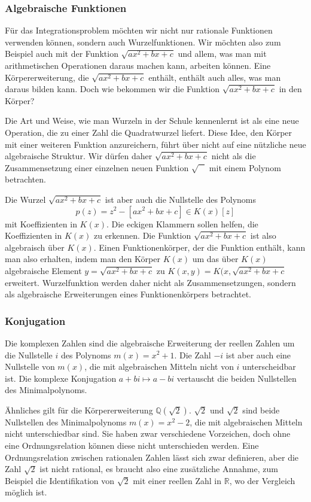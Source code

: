 %
%
\subsubsection{Algebraische Funktionen}
Für das Integrationsproblem möchten wir nicht nur rationale Funktionen
verwenden können, sondern auch Wurzelfunktionen.
Wir möchten also zum Beispiel auch mit der Funktion $\sqrt{ax^2+bx+c}$
und allem, was man mit arithmetischen Operationen daraus machen kann,
arbeiten können.
Eine Körpererweiterung, die $\sqrt{ax^2+bx+c}$ enthält, enthält auch
alles, was man daraus bilden kann.
Doch wie bekommen wir die Funktion $\sqrt{ax^2+bx+c}$ in den Körper?

Die Art und Weise, wie man Wurzeln in der Schule kennenlernt ist als
eine neue Operation, die zu einer Zahl die Quadratwurzel liefert.
Diese Idee, den Körper mit einer weiteren Funktion anzureichern,
führt über nicht auf eine nützliche neue algebraische Struktur.
Wir dürfen daher $\sqrt{ax^2+bx+c}$ nicht als die Zusammensetzung
einer einzelnen neuen Funktion $\sqrt{\phantom{A}}$ mit
einem Polynom betrachten.

Die Wurzel $\sqrt{ax^2+bx+c}$ ist aber auch die Nullstelle des Polynoms
\[
p(z)
=
z^2 - [ax^2+bx+c]
\in
K(x)[z]
\]
mit Koeffizienten in $K(x)$.
Die eckigen Klammern sollen helfen, die Koeffizienten in $K(x)$
zu erkennen.
Die Funktion $\sqrt{ax^2+bx+c}$ ist also algebraisch über $K(x)$.
Einen Funktionenkörper, der die Funktion enthält, kann man also erhalten,
indem man den Körper $K(x)$ um das über $K(x)$ algebraische Element
$y=\sqrt{ax^2+bx+c}$ zu $K(x,y)=K(x,\sqrt{ax^2+bx+c}$ erweitert.
Wurzelfunktion werden daher nicht als Zusammensetzungen, sondern als
algebraische Erweiterungen eines Funktionenkörpers betrachtet.

%
%
\subsubsection{Konjugation}
Die komplexen Zahlen sind die algebraische Erweiterung der reellen Zahlen
um die Nullstelle $i$ des Polynoms $m(x)=x^2+1$.
Die Zahl $-i$ ist aber auch eine Nullstelle von $m(x)$, die mit algebraischen
Mitteln nicht von $i$ unterscheidbar ist.
Die komplexe Konjugation $a+bi\mapsto a-bi$ vertauscht die beiden 
%
%
Nullstellen des Minimalpolynoms.

Ähnliches gilt für die Körpererweiterung $\mathbb{Q}(\!\sqrt{2})$.
$\sqrt{2}$ und $\sqrt{2}$ sind beide Nullstellen des Minimalpolynoms
$m(x)=x^2-2$, die mit algebraischen Mitteln nicht unterschiedbar sind.
Sie haben zwar verschiedene Vorzeichen, doch ohne eine Ordnungsrelation
können diese nicht unterschieden werden.
%
Eine Ordnungsrelation zwischen rationalen Zahlen lässt sich zwar
definieren, aber die Zahl $\sqrt{2}$ ist nicht rational, es braucht
also eine zusätzliche Annahme, zum Beispiel die Identifikation von
$\sqrt{2}$ mit einer reellen Zahl in $\mathbb{R}$, wo der Vergleich
möglich ist.

